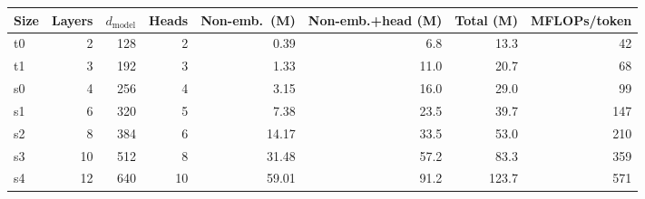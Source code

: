 \begin{tabular}{lrrrrrrr}
\toprule
Size & Layers & $d_\text{model}$ & Heads & Non-emb.\ (M) & Non-emb.+head (M) & Total (M) & MFLOPs/token \\
\midrule
t0 & 2 & 128 & 2 & 0.39 & 6.8 & 13.3 & 42 \\
t1 & 3 & 192 & 3 & 1.33 & 11.0 & 20.7 & 68 \\
s0 & 4 & 256 & 4 & 3.15 & 16.0 & 29.0 & 99 \\
s1 & 6 & 320 & 5 & 7.38 & 23.5 & 39.7 & 147 \\
s2 & 8 & 384 & 6 & 14.17 & 33.5 & 53.0 & 210 \\
s3 & 10 & 512 & 8 & 31.48 & 57.2 & 83.3 & 359 \\
s4 & 12 & 640 & 10 & 59.01 & 91.2 & 123.7 & 571 \\
\bottomrule
\end{tabular}
